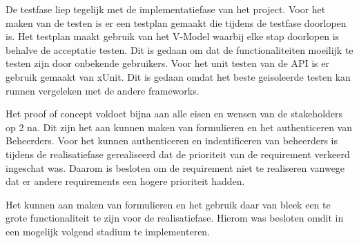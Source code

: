 \whitespace
De testfase liep tegelijk met de implementatiefase van het project.
Voor het maken van de testen is er een testplan gemaakt die tijdens de testfase doorlopen is.
Het testplan maakt gebruik van het V-Model waarbij elke stap doorlopen is behalve de acceptatie testen.
Dit is gedaan om dat de functionaliteiten moeilijk te testen zijn door onbekende gebruikers.
Voor het unit testen van de API is er gebruik gemaakt van xUnit.
Dit is gedaan omdat het beste geisoleerde testen kan runnen vergeleken met de andere frameworks.

\whitespace
Het proof of concept voldoet bijna aan alle eisen en wensen van de stakeholders op 2 na.
Dit zijn het aan kunnen maken van formulieren en het authenticeren van \gls{Beheerder}s.
Voor het kunnen authenticeren en indentificeren van beheerders is tijdens de realisatiefase gerealiseerd dat de prioriteit van de requirement verkeerd ingeschat was.
Daarom is besloten om de requirement niet te realiseren vanwege dat er andere requirements een hogere prioriteit hadden.

\whitespace
Het kunnen aan maken van formulieren en het gebruik daar van bleek een te grote functionaliteit te zijn voor de realisatiefase.
Hierom was besloten omdit in een mogelijk volgend stadium te implementeren.

